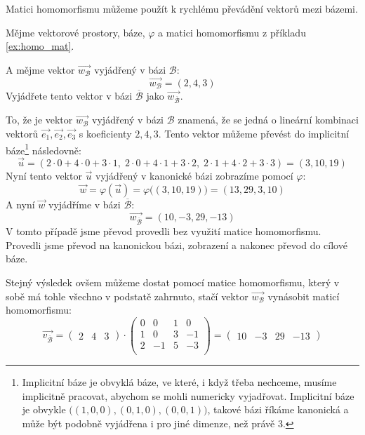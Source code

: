 Matici homomorfismu můžeme použít k rychlému převádění vektorů mezi bázemi.
\begin{example}
    Mějme vektorové prostory, báze, $\varphi$ a matici homomorfismu
    z příkladu \ref{ex:homo_mat}.

    A mějme vektor $\vec{w_{\mathcal{B}}}$ vyjádřený v bázi $\mathcal{B}$:
    $$\vec{w_{\mathcal{B}}} = (2, 4, 3)$$
    Vyjádřete tento vektor v bázi $\overline{\mathcal{B}}$ jako
    $\vec{w_{\overline{\mathcal{B}}}}$.

    To, že je vektor $\vec{w_{\mathcal{B}}}$ vyjádřený v bázi $\mathcal{B}$ znamená,
    že se jedná o lineární kombinaci vektorů $\vec{e_1}, \vec{e_2}, \vec{e_3}$ s koeficienty
    $2, 4, 3$.
    Tento vektor můžeme převést do implicitní báze\footnote{Implicitní báze je obvyklá báze, ve
    které, i když třeba nechceme, musíme implicitně pracovat, abychom se mohli
    numericky vyjadřovat. Implicitní báze je obvykle
    $\big((1, 0, 0), (0, 1, 0), (0, 0, 1) \big)$, takové bázi říkáme kanonická a může být
    podobně vyjádřena i pro jiné dimenze, než právě 3.} následovně:
    $$\vec{u} = (2\cdot 0 + 4\cdot 0 + 3\cdot 1,\; 2\cdot 0 + 4\cdot 1 + 3\cdot 2,\;
    2\cdot 1 + 4\cdot 2 + 3\cdot 3) = (3, 10, 19)$$
    Nyní tento vektor $\vec{u}$ vyjádřený v kanonické bázi zobrazíme pomocí $\varphi$:
    $$\vec{w} = \varphi(\vec{u}) = \varphi\big( (3, 10, 19) \big) = (13, 29, 3, 10)$$
    A nyní $\vec{w}$ vyjádříme v bázi $\overline{\mathcal{B}}$:
    $$\vec{w_{\overline{\mathcal{B}}}} = (10, -3, 29, -13)$$
    V tomto případě jsme převod provedli bez využití matice homomorfismu. Provedli jsme převod
    na kanonickou bázi, zobrazení a nakonec převod do cílové báze.

    Stejný výsledek ovšem můžeme dostat pomocí matice homomorfismu, který v sobě má tohle
    všechno v podstatě zahrnuto, stačí vektor $\vec{w_{\mathcal{B}}}$ vynásobit maticí homomorfismu:
    \[
        \vec{v_{\overline{\mathcal{B}}}} =
        \begin{pmatrix}
            2 & 4 & 3
        \end{pmatrix} \cdot
        \begin{pmatrix}
            0 & 0 & 1 & 0\\
            1 & 0 & 3 & -1\\
            2 & -1 & 5 & -3\\
        \end{pmatrix} =
        \begin{pmatrix}
            10 & -3 & 29 & -13
        \end{pmatrix}
    \]
\end{example}

